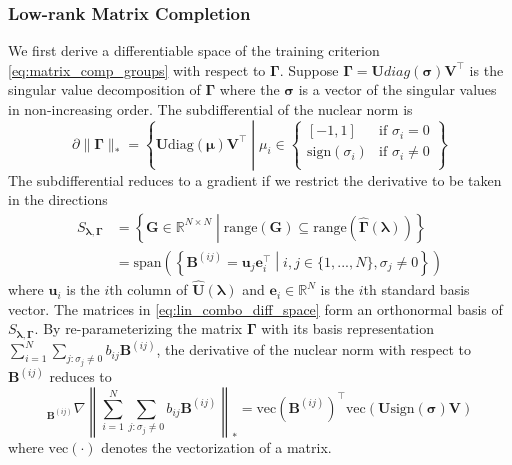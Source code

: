 \documentclass[12pt,letterpaper]{article}
\begin{document}
\subsubsection{Low-rank Matrix Completion}
We first derive a differentiable space of the training criterion \eqref{eq:matrix_comp_groups} with respect to $\boldsymbol{\Gamma}$. 
Suppose $\boldsymbol{\Gamma} = \boldsymbol{U}diag(\boldsymbol{\sigma}) \boldsymbol{V}^\top$ is the singular value decomposition of $\boldsymbol{\Gamma}$ where the $\boldsymbol{\sigma}$ is a vector of the singular values in non-increasing order. The subdifferential of the nuclear norm is \citep{parikh2014proximal}
\begin{equation}
\partial \| \boldsymbol{\Gamma} \|_* = 
\left \{
\boldsymbol{U} \text{diag}(\boldsymbol{\mu}) \boldsymbol{V}^\top \middle | 
\mu_i \in 
\begin{cases}
[-1, 1] & \text{if } \sigma_i = 0\\
\text{sign}(\sigma_i) & \text{if } \sigma_i \ne 0\\
\end{cases}
\right \}
\end{equation}
The subdifferential reduces to a gradient if we restrict the derivative to be taken in the directions
\begin{align}
S_{\boldsymbol{\lambda}, \boldsymbol{\Gamma}} & =  \left \{
\boldsymbol{G} \in \mathbb{R}^{N\times N}
\middle |
\text{range}(\boldsymbol{G}) \subseteq \text{range}(\hat{\boldsymbol{\Gamma}}(\boldsymbol{\lambda}))
\right \} \\
& = 
\text{span}
\left (
\left \{
\boldsymbol{B}^{(ij)} = \boldsymbol{u}_j \boldsymbol{e}_i^\top
\middle | 
i,j  \in \{1,...,N\},
\sigma_j \ne 0
\right \}
\right )
\label{eq:lin_combo_diff_space}
\end{align}
where $\boldsymbol{u}_i$ is the $i$th column of $\hat{\boldsymbol{U}}(\boldsymbol{\lambda})$ and $\boldsymbol{e}_i \in \mathbb{R}^N$ is the $i$th standard basis vector. The matrices in \eqref{eq:lin_combo_diff_space} form an orthonormal basis of $S_{\boldsymbol{\lambda}, \boldsymbol{\Gamma}}$. By re-parameterizing the matrix $\boldsymbol{\Gamma}$ with its basis representation $\sum_{i=1}^N \sum_{j : \sigma_j \ne 0} b_{ij} \boldsymbol{B}^{(ij)}$, the derivative of the nuclear norm with respect to $\boldsymbol{B}^{(ij)}$ reduces to
\begin{equation}
_{\boldsymbol{B}^{(ij)}}\nabla 
\left \| \sum_{i=1}^N \sum_{j : \sigma_j \ne 0} b_{ij} \boldsymbol{B}^{(ij)} 
\right \|_{*} = 
\text{vec} \left (\boldsymbol{B}^{(ij)} \right )^\top
\text{vec} \left ( \boldsymbol{U} \text{sign}(\boldsymbol{\sigma}) \boldsymbol{V} \right )
\label{eq:basis_repr_deriv}
\end{equation}
where $\text{vec}(\cdot)$ denotes the vectorization of a matrix.
\end{document}

